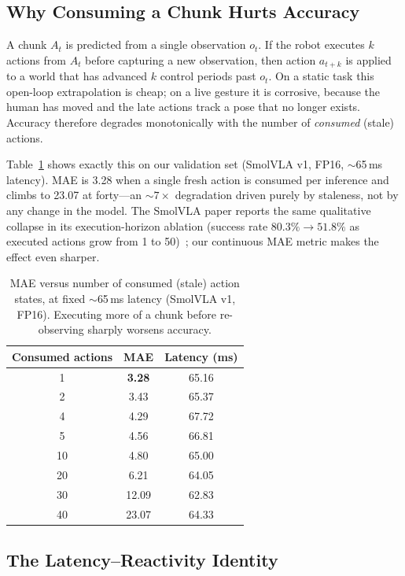 \documentclass[blind]{gtac}
\begin{document}
\subsection{Why Consuming a Chunk Hurts Accuracy}

A chunk $A_t$ is predicted from a single observation $o_t$. If the robot executes
$k$ actions from $A_t$ before capturing a new observation, then action $a_{t+k}$
is applied to a world that has advanced $k$ control periods past $o_t$. On a
static task this open-loop extrapolation is cheap; on a live gesture it is
corrosive, because the human has moved and the late actions track a pose that no
longer exists. Accuracy therefore degrades monotonically with the number of
\emph{consumed} (stale) actions.

Table~\ref{tab:actionstates} shows exactly this on our validation set (SmolVLA
v1, FP16, $\sim$65\,ms latency). MAE is 3.28 when a single fresh action is
consumed per inference and climbs to 23.07 at forty---an $\sim\!7\times$
degradation driven purely by staleness, not by any change in the model. The
SmolVLA paper reports the same qualitative collapse in its execution-horizon
ablation (success rate $80.3\%\!\rightarrow\!51.8\%$ as executed actions grow
from 1 to 50)~\cite{smolvla}; our continuous MAE metric makes the effect even
sharper.

\begin{table}[H]
\centering
\caption{MAE versus number of consumed (stale) action states, at fixed
$\sim$65\,ms latency (SmolVLA v1, FP16). Executing more of a chunk before
re-observing sharply worsens accuracy.}
\label{tab:actionstates}
\footnotesize
\begin{tabular}{@{}ccc@{}}
\toprule
Consumed actions & MAE & Latency (ms) \\
\midrule
1  & \textbf{3.28} & 65.16 \\
2  & 3.43 & 65.37 \\
4  & 4.29 & 67.72 \\
5  & 4.56 & 66.81 \\
10 & 4.80 & 65.00 \\
20 & 6.21 & 64.05 \\
30 & 12.09 & 62.83 \\
40 & 23.07 & 64.33 \\
\bottomrule
\end{tabular}
\end{table}

\subsection{The Latency--Reactivity Identity}
\end{document}
